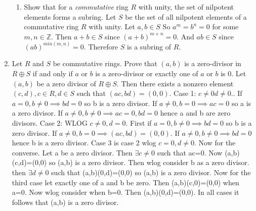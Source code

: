 \documentclass{article}
\newcommand{\ZZ}{\mathbb{Z}}
\begin{document}
\begin{enumerate}
\begin{enumerate}
        \item Show that for a \emph{commutative} ring $R$ with unity, the set of nilpotent elements forms a subring.
Let $S$ be the set of all nilpotent elements of a commutative ring $R$ with unity. Let $a,b \in S$ So $a^{m}=b^{n}=0$ for some $m,n\in \ZZ$. Then $a+b \in S$ since $(a+b)^{m+n}=0$. And $ab\in S$ since $(ab)^{min(m,n)} =0$. Therefore $S$ is a subring of $R$.
        \end{enumerate}
   \item Let $R$ and $S$ be commutative rings. Prove that $(a,b)$ is a zero-divisor in $R\oplus S$ if and only if $a$ or $b$ is a zero-divisor or exactly one of $a$ or $b$ is 0. 
Let $(a,b)$ be a zero divisor of $R\oplus S$. Then there exists a nonzero element $(c,d),c\in R,d\in S$ such that $(ac,bd)=(0,0)$. Case 1: $c\neq0 d\neq 0$.. If $a=0,b\neq0\implies bd =0$ so b is a zero divisor. If $a\neq 0, b=0 \implies ac=0$ so a is a zero divisor. If $a\neq 0,b\neq 0\implies ac=0, bd=0$ hence a and b are zero divisors. Case 2: WLOG $c\neq0, d=0$. First  if $a=0,b\neq0\implies bd =0$ so b is a zero divisor. If $a\neq 0, b=0 \implies (ac,bd)=(0,0)$. If $a\neq 0,b\neq 0\implies bd=0$ hence b is a zero divisor. Case 3 is case 2 wlog $c=0,d\neq0$. Now for the converse. Let a be a zero divisor. Then $\exists c\neq 0$ such that ac=0. Now (a,b)(c,d)=(0,0) so (a,b) is a zero divisor. Then wlog consider b as a zero divisor. then $\exists d \neq 0$ such that (a,b)(0,d)=(0,0) so (a,b) is a zero divisor. Now for the third case let exactly one of a and b be zero. Then (a,b)(c,0)=(0,0) when a=0. Now wlog consider when b=0. Then (a,b)(0,d)=(0,0). In all cases it follows that (a,b) is a zero divisor. 
\end{enumerate}
\end{document}
